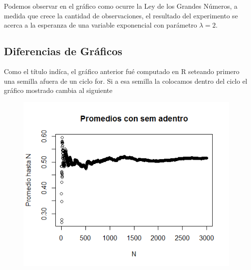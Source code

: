 \documentclass[a4paper]{article}
\begin{document}
	

	Podemos observar en el gr\'afico como ocurre la Ley de los Grandes N\'umeros, a medida que crece la cantidad de observaciones, el resultado del experimento se acerca a la esperanza de una variable exponencial con par\'ametro $\lambda = 2$.  
	
%
	
	\smallskip
	
	\subsection{Diferencias de Gr\'aficos}
	
	Como el t\'itulo ind\'ica, el gr\'afico anterior fu\'e computado en R seteando primero una semilla afuera de un ciclo for. Si a esa semilla la colocamos dentro del ciclo el gr\'afico mostrado cambia al siguiente
	
	
	\begin{figure}[H]
		\includegraphics[scale=0.75]{grafico2}
		\centering
	\end{figure}
	
\end{document}
